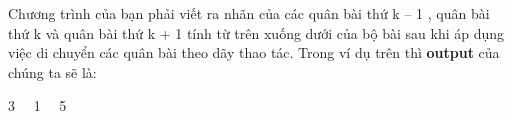 Chương trình của bạn phải viết ra nhãn của các quân bài thứ k – 1 , quân bài thứ k và quân bài thứ k + 1 tính từ trên xuống dưới của bộ bài sau khi áp dụng việc di chuyển các quân bài theo dãy thao tác. Trong ví dụ trên thì \textbf{output} của chúng ta sẽ là:

3   1   5